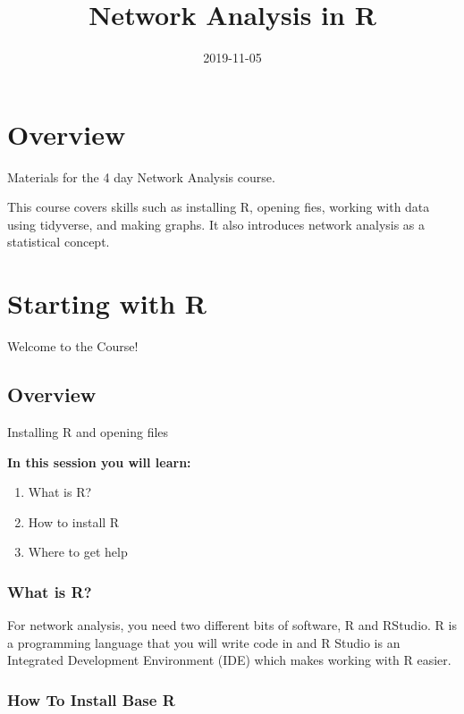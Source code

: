 \documentclass[]{book}
\title{Network Analysis in R}
\author{}
\date{2019-11-05}
\providecommand{\tightlist}{%
  \setlength{\itemsep}{0pt}\setlength{\parskip}{0pt}}
\begin{document}
\maketitle

{
\setcounter{tocdepth}{1}
\tableofcontents
}
\hypertarget{overview}{%
\chapter*{Overview}\label{overview}}

Materials for the 4 day Network Analysis course.

This course covers skills such as installing R, opening fies, working with data using tidyverse, and making graphs. It also introduces network analysis as a statistical concept.

\hypertarget{starting-with-r}{%
\chapter{Starting with R}\label{starting-with-r}}

{Welcome to the Course!}

\hypertarget{overview-1}{%
\section{Overview}\label{overview-1}}

Installing R and opening files

\textbf{In this session you will learn:}

\begin{enumerate}
\def\labelenumi{\arabic{enumi}.}
\tightlist
\item
  What is R?
\item
  How to install R
\item
  Where to get help
\end{enumerate}

\hypertarget{what-is-r}{%
\subsection{What is R?}\label{what-is-r}}

For network analysis, you need two different bits of software, R and RStudio. R is a programming language that you will write code in and R Studio is an Integrated Development Environment (IDE) which makes working with R easier.

\hypertarget{how-to-install-base-r}{%
\subsection{How To Install Base R}\label{how-to-install-base-r}}
\end{document}
